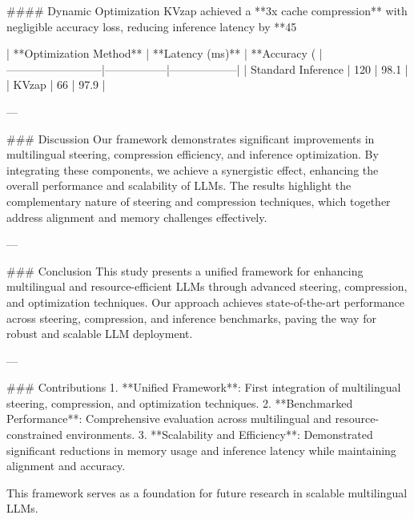 #### Dynamic Optimization  
KVzap achieved a **3x cache compression** with negligible accuracy loss, reducing inference latency by **45%

| **Optimization Method** | **Latency (ms)** | **Accuracy (%
|--------------------------|-----------------|------------------|  
| Standard Inference      | 120            | 98.1             |  
| KVzap                   | 66             | 97.9             |  

---

### Discussion  
Our framework demonstrates significant improvements in multilingual steering, compression efficiency, and inference optimization. By integrating these components, we achieve a synergistic effect, enhancing the overall performance and scalability of LLMs. The results highlight the complementary nature of steering and compression techniques, which together address alignment and memory challenges effectively.

---

### Conclusion  
This study presents a unified framework for enhancing multilingual and resource-efficient LLMs through advanced steering, compression, and optimization techniques. Our approach achieves state-of-the-art performance across steering, compression, and inference benchmarks, paving the way for robust and scalable LLM deployment.

---

### Contributions  
1. **Unified Framework**: First integration of multilingual steering, compression, and optimization techniques.  
2. **Benchmarked Performance**: Comprehensive evaluation across multilingual and resource-constrained environments.  
3. **Scalability and Efficiency**: Demonstrated significant reductions in memory usage and inference latency while maintaining alignment and accuracy.  

This framework serves as a foundation for future research in scalable multilingual LLMs.